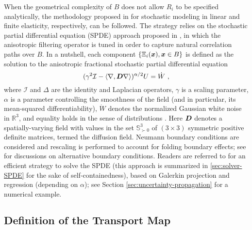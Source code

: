When the geometrical complexity of $B$ does not allow $R_i$ to be specified analytically, the methodology proposed in \cite{STABER2017399,STABER201894} for stochastic modeling in linear and finite elasticity, respectively, can be followed. The strategy relies on the stochastic partial differential equation (SPDE) approach proposed in \cite{Lindgren2011}, in which the anisotropic filtering operator is tuned in order to capture natural correlation paths over $B$. In a nutshell, each component $\{\Xi_i(\boldsymbol{x}), \boldsymbol{x} \in B\}$ is defined as the solution to the anisotropic fractional stochastic partial differential equation \cite{Whittle,Fuglstad}
\begin{equation}
    (\gamma^2 \mathcal{I} -\langle \nabla, \boldsymbol{D}\nabla\rangle)^{\alpha/2} U = \dot{W}~,
    \label{eq:spdeH}
\end{equation}
where $\mathcal{I}$ and $\Delta$ are the identity and Laplacian operators, $\gamma$ is a scaling parameter, $\alpha$ is a parameter controlling the smoothness of the field (and in particular, its mean-squared differentiability), $\dot{W}$ denotes the normalized Gaussian white noise in $\mathbb{R}^3$, and equality holds in the sense of distributions \cite{Whittle}. Here $\boldsymbol{D}$ denotes a spatially-varying field with values in the set $\mathbb{S}_{\succ 0}^3$ of $(3 \times 3)$ symmetric positive definite matrices, termed the diffusion field. Neumann boundary conditions are considered and rescaling is performed to account for folding boundary effects; see \cite{Roininen2014,Daon2018,Khristenko2019} for discussions on alternative boundary conditions. Readers are referred to \cite{Lindgren2011} for an efficient strategy to solve the SPDE (this approach is summarized in \ref{sec:solver-SPDE} for the sake of self-containedness), based on Galerkin projection and regression (depending on $\alpha$); see Section \ref{sec:uncertainty-propagation} for a numerical example. 

\subsection{Definition of the Transport Map}

